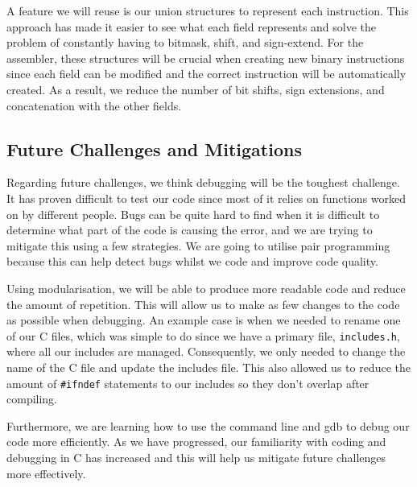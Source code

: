 \documentclass[11pt]{article}
\begin{document}
A feature we will reuse is our union structures to represent each instruction. This approach has made it easier to see what each field represents and solve the problem of constantly having to bitmask, shift, and sign-extend. For the assembler, these structures will be crucial when creating new binary instructions since each field can be modified and the correct instruction will be automatically created. As a result, we reduce the number of bit shifts, sign extensions, and concatenation with the other fields.


\subsection{Future Challenges and Mitigations}


Regarding future challenges, we think debugging will be the toughest challenge. It has proven difficult to test our code since most of it relies on functions worked on by different people. Bugs can be quite hard to find when it is difficult to determine what part of the code is causing the error, and we are trying to mitigate this using a few strategies. We are going to utilise pair programming because this can help detect bugs whilst we code and improve code quality.

Using modularisation, we will be able to produce more readable code and reduce the amount of repetition. This will allow us to make as few changes to the code as possible when debugging. An example case is when we needed to rename one of our C files, which was simple to do since we have a primary file, \verb|includes.h|, where all our includes are managed. Consequently, we only needed to change the name of the C file and update the includes file. This also allowed us to reduce the amount of \verb|#ifndef| statements to our includes so they don’t overlap after compiling.

Furthermore, we are learning how to use the command line and gdb to debug our code more efficiently. As we have progressed, our familiarity with coding and debugging in C has increased and this will help us mitigate future challenges more effectively.
\end{document}
